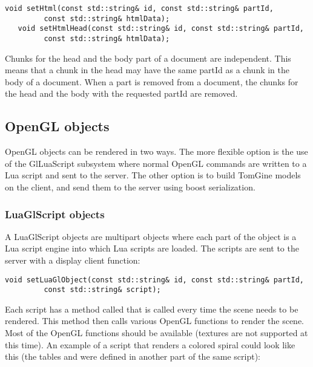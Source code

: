 \begin{Verbatim}[fontsize=\scriptsize,gobble=3]
   void setHtml(const std::string& id, const std::string& partId,
         const std::string& htmlData); 
   void setHtmlHead(const std::string& id, const std::string& partId,
         const std::string& htmlData); 
\end{Verbatim}

Chunks for the head and the body part of a document are independent. This means
that a chunk in the head may have the same partId as a chunk in the body of
a document. When a part is removed from a document, the chunks for the head
and the body with the requested partId are removed.

\subsection{OpenGL objects}

OpenGL objects can be rendered in two ways. The more flexible option is the use
of the GlLuaScript subsystem where normal OpenGL commands are written to a Lua
script and sent to the server. The other option is to build TomGine models on
the client, and send them to the server using boost serialization. 


\subsubsection{LuaGlScript objects}

A LuaGlScript objects are multipart objects where each part of the object is a
Lua script engine into which Lua scripts are loaded. The scripts are sent to
the server with a display client function:

\begin{Verbatim}[fontsize=\scriptsize,gobble=3]
   void setLuaGlObject(const std::string& id, const std::string& partId,
         const std::string& script);
\end{Verbatim}

Each script has a method called  that is called every time the
scene needs to be rendered.  This method then calls various OpenGL functions to
render the scene. Most of the OpenGL functions should be available (textures
are not supported at this time). An example of a script that renders a colored
spiral could look like this (the tables  and  were
defined in another part of the same script):

